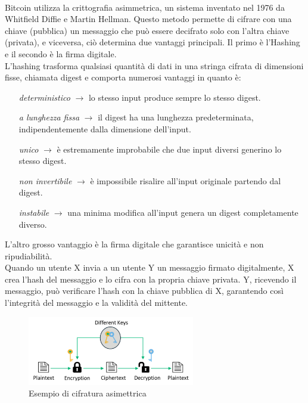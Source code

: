 \\Bitcoin utilizza la crittografia asimmetrica, un sistema inventato nel 1976 da Whitfield Diffie e Martin Hellman. Questo metodo permette di cifrare con una chiave (pubblica) un messaggio che può essere decifrato solo con l’altra chiave (privata), e viceversa, ciò determina due vantaggi principali.
Il primo è l'Hashing e il secondo è la firma digitale.
\\L'hashing trasforma qualsiasi quantità di dati in una stringa cifrata di dimensioni fisse, chiamata digest e comporta numerosi vantaggi in quanto è: 
\begin{adjustwidth}{1cm}{0pt}
    \begin{itemize}
        \item[\textit{deterministico} $\rightarrow$ ] lo stesso input produce sempre lo stesso digest.
        \item [\textit{a lunghezza fissa} $\rightarrow$ ] il digest ha una lunghezza predeterminata, indipendentemente dalla dimensione dell’input.
        \item [\textit{unico} $\rightarrow$ ] è estremamente improbabile che due input diversi generino lo stesso digest.
        \item [\textit{non invertibile} $\rightarrow$ ] è impossibile risalire all’input originale partendo dal digest.
        \item [\textit{instabile} $\rightarrow$ ] una minima modifica all’input genera un digest completamente diverso.
    \end{itemize}
\end{adjustwidth}
\newpage
L'altro grosso vantaggio è la firma digitale che garantisce unicità e non ripudiabilità. 
\\Quando un utente X invia a un utente Y un messaggio firmato digitalmente, X crea l’hash del messaggio e lo cifra con la propria chiave privata. Y, ricevendo il messaggio, può verificare l’hash con la chiave pubblica di X, garantendo così l’integrità del messaggio e la validità del mittente.
\begin{figure}[h]
\centering
\includegraphics[width=0.65\textwidth]{Immagini/cifratura asimmetrica.png}
\caption{Esempio di cifratura asimettrica}
\end{figure}
